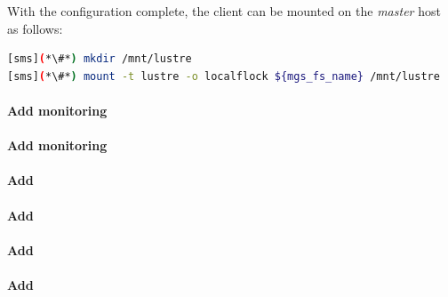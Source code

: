 \documentclass[letterpaper]{article}
\begin{document}
With the \Lustre{} configuration complete, the client can be mounted on the {\em master}
host as follows:
\begin{lstlisting}[language=bash,keywords={},upquote=true]
[sms](*\#*) mkdir /mnt/lustre
[sms](*\#*) mount -t lustre -o localflock ${mgs_fs_name} /mnt/lustre
\end{lstlisting}

\paragraph{Add \Nagios{} monitoring}


\clearpage
\paragraph{Add \Ganglia{} monitoring}


\paragraph{Add \clustershell{}}


\paragraph{Add \mrsh{}}


\paragraph{Add \genders{}}


\paragraph{Add \powerman{}}


\end{document}
